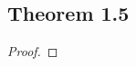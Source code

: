 \documentclass[../../main.tex]{subfiles}
\begin{document}
\subsection{Theorem 1.5}
\begin{wts}

\end{wts}
\begin{proof}

\end{proof}
\end{document}
